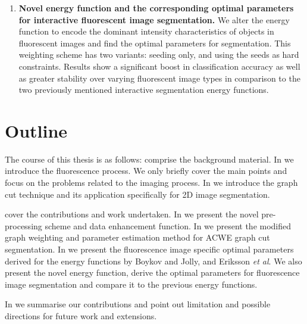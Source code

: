 \begin{enumerate}
	\item
	\textbf{Novel energy function and the corresponding optimal parameters for interactive fluorescent image segmentation.}
	We alter the energy function to encode the dominant intensity characteristics of objects in fluorescent images and find the optimal parameters for segmentation. This weighting scheme has two variants: seeding only, and using the seeds as hard constraints. Results show a significant boost in classification accuracy as well as greater stability over varying fluorescent image types in comparison to the two previously mentioned interactive segmentation energy functions. 
\end{enumerate}


\section{Outline}


The course of this thesis is as follows:
 comprise the background material.
In  we introduce the fluorescence process. We only briefly cover the main points  and focus on the problems related to the imaging process.
In  we introduce the graph cut technique and its application specifically for 2D image segmentation.

 cover the contributions and work undertaken.
In  we present the novel pre-processing scheme and data enhancement function.
In  we present the modified graph weighting and parameter estimation method for ACWE graph cut segmentation.
In  we present the fluorescence image specific optimal parameters derived for the energy functions by Boykov and Jolly, and Eriksson \textit{et al}. We also present the novel energy function, derive the optimal parameters for fluorescence image segmentation and compare it to the previous energy functions.

In  we summarise our contributions and point out limitation and possible directions for future work and extensions.